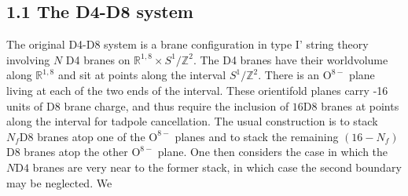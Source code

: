 \documentclass{article}
\begin{document}
\subsection*{1.1 The D4-D8 system}
The original D4-D8 system is a brane configuration in type I' string theory involving \(N\) D4 branes on \(\mathbb{R}^{1,8} \times S^{1} / \mathbb{Z}^{2}\). The D4 branes have their worldvolume along \(\mathbb{R}^{1,8}\) and sit at points along the interval \(S^{1} / \mathbb{Z}^{2}\). There is an \(\mathrm{O}^{8-}\) plane living at each of the two ends of the interval. These orientifold planes carry -16 units of D8 brane charge, and thus require the inclusion of \(16 \mathrm{D} 8\) branes at points along the interval for tadpole cancellation. The usual construction is to stack \(N_{f} \mathrm{D} 8\) branes atop one of the \(\mathrm{O}^{8-}\) planes and to stack the remaining \(\left(16-N_{f}\right)\) D8 branes atop the other \(\mathrm{O}^{8-}\) plane. One then considers the case in which the \(N \mathrm{D} 4\) branes are very near to the former stack, in which case the second boundary may be neglected. We
\end{document}
